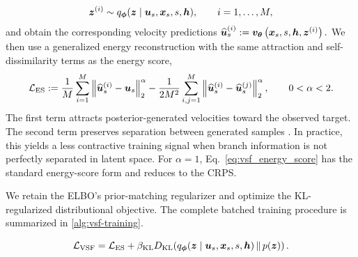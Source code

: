 \documentclass{article} %
\numberwithin{equation}{section}
\begin{document}
\begin{equation}
    {\bm{z}}^{(i)}
    \sim
    q_{\boldsymbol{\phi}}({\bm{z}}\mid{\bm{u}}_s,{\bm{x}}_s,s,{\bm{h}}),
    \qquad
    i=1,\ldots,M,
    \label{eq:posterior_latent_samples}
\end{equation}
and obtain the corresponding velocity predictions
\(
    \widehat{{\bm{u}}}_s^{(i)}
    :=
    {\bm{v}}_{{\bm{\theta}}}
    \left(
        {\bm{x}}_s,
        s,
        {\bm{h}},
        {\bm{z}}^{(i)}
    \right).
    \label{eq:posterior_velocity_samples}
\)
We then use a generalized energy reconstruction with the same attraction and
self-dissimilarity terms as the energy score,
\begin{equation}
    \mathcal L_{\mathrm{ES}}
    :=
    \frac{1}{M}
    \sum_{i=1}^{M}
    \left\|
        \widehat{{\bm{u}}}_s^{(i)}-{\bm{u}}_s
    \right\|_2^\alpha
    -
    \frac{1}{2M^2}
    \sum_{i,j=1}^{M}
    \left\|
        \widehat{{\bm{u}}}_s^{(i)}
        -
        \widehat{{\bm{u}}}_s^{(j)}
    \right\|_2^\alpha,
    \qquad
    0<\alpha<2.
    \label{eq:vsf_energy_score}
\end{equation}
The first term attracts posterior-generated velocities toward the observed
target. The second  term preserves separation between generated samples \citep{bouchacourt2016disco}. In practice, this yields a less contractive training
signal when branch information is not perfectly separated in latent space. For $\alpha=1$, Eq.~\ref{eq:vsf_energy_score} has the standard energy-score
form and reduces to the CRPS. 

We retain the ELBO's prior-matching
regularizer and optimize the KL-regularized distributional objective. The complete batched training procedure is summarized in
\cref{alg:vsf-training}.
%
\begin{tcolorbox}[
  colback=parchment,
  colframe=sandborder,
  boxrule=0.3pt,
  left=8pt,
  right=8pt,
  top=3pt,
  bottom=3pt
]
\begin{equation}
    \mathcal L_{\mathrm{VSF}}
    =
    \mathcal L_{\mathrm{ES}}
    +
    \beta_{\mathrm{KL}}
    D_{\mathrm{KL}}\!\left(
        q_{\boldsymbol{\phi}}({\bm{z}}\mid{\bm{u}}_s,{\bm{x}}_s,s,{\bm{h}})
        \,\Vert\,
        p({\bm{z}})
    \right).
    \label{eq:vsf_training_objective}
\end{equation}
\end{tcolorbox}
%
%
\end{document}
